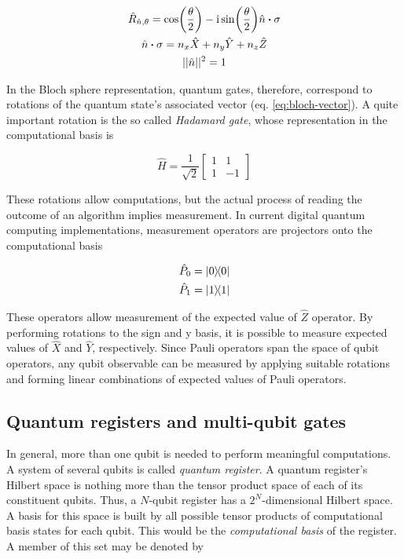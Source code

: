   \begin{gather}
    \hat{R}_{\hat{n}, \theta} = \cos(\frac{\theta}{2}) - \mathrm{i}\sin(\frac{\theta}{2}) \hat{n} \vdot \sigma \\
    \hat{n} \vdot \sigma = n_x \hat{X} + n_y \hat{Y} + n_z \hat{Z} \\
    ||\hat{n}||^2 = 1
  \end{gather}

  In the Bloch sphere representation, quantum gates, therefore, correspond to rotations of the quantum state's associated vector (eq. \ref{eq:bloch-vector}). A quite important rotation is the so called \textit{Hadamard gate}, whose representation in the computational basis is
  
  \begin{equation}
    \hat{H} = \frac{1}{\sqrt{2}}\begin{bmatrix}
      1 & 1 \\
      1 & -1
    \end{bmatrix}
    \label{eq:hadamard-gate}
  \end{equation}
  
  
  These rotations allow computations, but the actual process of reading the outcome of an algorithm implies measurement. In current digital quantum computing implementations, measurement operators are projectors onto the computational basis

  \begin{gather}
    \hat{P}_0 = \ketbra{0}{0} \\
    \hat{P}_1 = \ketbra{1}{1} 
    \label{eq:measurement-ops}
  \end{gather}

  These operators allow measurement of the expected value of $\hat{Z}$ operator. By performing rotations to the sign and y basis, it is possible to measure expected values of $\hat{X}$ and $\hat{Y}$, respectively. Since Pauli operators span the space of qubit operators, any qubit observable can be measured by applying suitable rotations and forming linear combinations of expected values of Pauli operators.

  \subsection{Quantum registers and multi-qubit gates}

    In general, more than one qubit is needed to perform meaningful computations. A system of several qubits is called \textit{quantum register}. A quantum register's Hilbert space is nothing more than the tensor product space of each of its constituent qubits. Thus, a $N$-qubit register has a $2^N$-dimensional Hilbert space. A basis for this space is built by all possible tensor products of computational basis states for each qubit. This would be the \textit{computational basis} of the register. A member of this set may be denoted by

